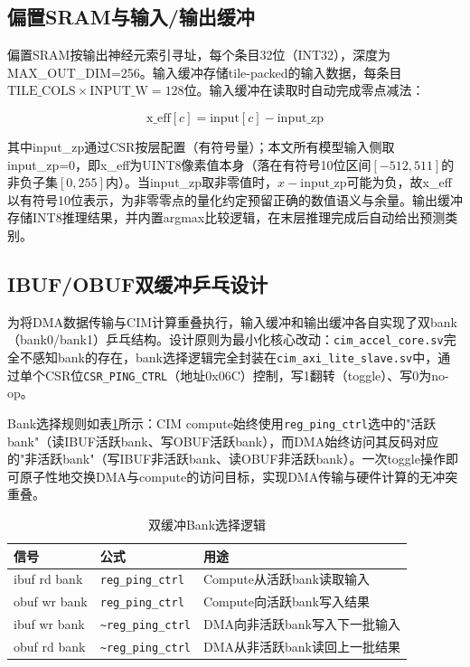 \documentclass[bachelor,compact,nofont]{xjtuthesis}
\numberwithin{equation}{chapter}
\begin{document}
\subsection{偏置SRAM与输入/输出缓冲}

偏置SRAM按输出神经元索引寻址，每个条目32位（INT32），深度为MAX\_OUT\_DIM=256。输入缓冲存储tile-packed的输入数据，每条目$\text{TILE\_COLS} \times \text{INPUT\_W} = 128$位。输入缓冲在读取时自动完成零点减法：

\begin{equation}
	\text{x\_eff}[c] = \text{input}[c] - \text{input\_zp}
\end{equation}

其中input\_zp通过CSR按层配置（有符号量）；本文所有模型输入侧取input\_zp=0，即x\_eff为UINT8像素值本身（落在有符号10位区间$[-512,511]$的非负子集$[0,255]$内）。当input\_zp取非零值时，$x-\text{input\_zp}$可能为负，故x\_eff以有符号10位表示，为非零零点的量化约定预留正确的数值语义与余量。输出缓冲存储INT8推理结果，并内置argmax比较逻辑，在末层推理完成后自动给出预测类别。

\subsection{IBUF/OBUF双缓冲乒乓设计}

为将DMA数据传输与CIM计算重叠执行，输入缓冲和输出缓冲各自实现了双bank（bank0/bank1）乒乓结构。设计原则为最小化核心改动：\texttt{cim\_accel\_core.sv}完全不感知bank的存在，bank选择逻辑完全封装在\texttt{cim\_axi\_lite\_slave.sv}中，通过单个CSR位\texttt{CSR\_PING\_CTRL}（地址0x06C）控制，写1翻转（toggle）、写0为no-op。

Bank选择规则如表\ref{tab:pingpong_bank}所示：CIM compute始终使用\texttt{reg\_ping\_ctrl}选中的"活跃bank"（读IBUF活跃bank、写OBUF活跃bank），而DMA始终访问其反码对应的"非活跃bank"（写IBUF非活跃bank、读OBUF非活跃bank）。一次toggle操作即可原子性地交换DMA与compute的访问目标，实现DMA传输与硬件计算的无冲突重叠。

\begin{table}[H]
	\centering
	\caption{双缓冲Bank选择逻辑}
	\label{tab:pingpong_bank}
	\begin{tabularx}{\textwidth}{l>{\raggedright\arraybackslash}Xl}
		\toprule
		信号 & 公式 & 用途 \\
		\midrule
		ibuf rd bank & \texttt{reg\_ping\_ctrl} & Compute从活跃bank读取输入 \\
		obuf wr bank & \texttt{reg\_ping\_ctrl} & Compute向活跃bank写入结果 \\
		ibuf wr bank & \texttt{\textasciitilde reg\_ping\_ctrl} & DMA向非活跃bank写入下一批输入 \\
		obuf rd bank & \texttt{\textasciitilde reg\_ping\_ctrl} & DMA从非活跃bank读回上一批结果 \\
		\bottomrule
	\end{tabularx}
\end{table}
\end{document}
